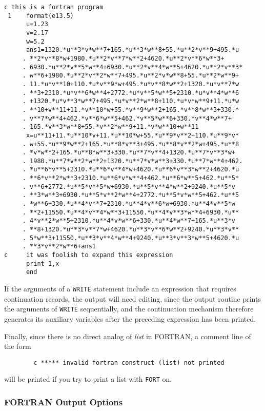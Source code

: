 \documentclass[11pt,letterpaper]{book}
\begin{document}
{\small
{\small\begin{verbatim}
c this is a fortran program
 1    format(e13.5)
      u=1.23
      v=2.17
      w=5.2
      ans1=1320.*u**3*v*w**7+165.*u**3*w**8+55.*u**2*v**9+495.*u
     . **2*v**8*w+1980.*u**2*v**7*w**2+4620.*u**2*v**6*w**3+
     . 6930.*u**2*v**5*w**4+6930.*u**2*v**4*w**5+4620.*u**2*v**3*
     . w**6+1980.*u**2*v**2*w**7+495.*u**2*v*w**8+55.*u**2*w**9+
     . 11.*u*v**10+110.*u*v**9*w+495.*u*v**8*w**2+1320.*u*v**7*w
     . **3+2310.*u*v**6*w**4+2772.*u*v**5*w**5+2310.*u*v**4*w**6
     . +1320.*u*v**3*w**7+495.*u*v**2*w**8+110.*u*v*w**9+11.*u*w
     . **10+v**11+11.*v**10*w+55.*v**9*w**2+165.*v**8*w**3+330.*
     . v**7*w**4+462.*v**6*w**5+462.*v**5*w**6+330.*v**4*w**7+
     . 165.*v**3*w**8+55.*v**2*w**9+11.*v*w**10+w**11
      x=u**11+11.*u**10*v+11.*u**10*w+55.*u**9*v**2+110.*u**9*v*
     . w+55.*u**9*w**2+165.*u**8*v**3+495.*u**8*v**2*w+495.*u**8
     . *v*w**2+165.*u**8*w**3+330.*u**7*v**4+1320.*u**7*v**3*w+
     . 1980.*u**7*v**2*w**2+1320.*u**7*v*w**3+330.*u**7*w**4+462.
     . *u**6*v**5+2310.*u**6*v**4*w+4620.*u**6*v**3*w**2+4620.*u
     . **6*v**2*w**3+2310.*u**6*v*w**4+462.*u**6*w**5+462.*u**5*
     . v**6+2772.*u**5*v**5*w+6930.*u**5*v**4*w**2+9240.*u**5*v
     . **3*w**3+6930.*u**5*v**2*w**4+2772.*u**5*v*w**5+462.*u**5
     . *w**6+330.*u**4*v**7+2310.*u**4*v**6*w+6930.*u**4*v**5*w
     . **2+11550.*u**4*v**4*w**3+11550.*u**4*v**3*w**4+6930.*u**
     . 4*v**2*w**5+2310.*u**4*v*w**6+330.*u**4*w**7+165.*u**3*v
     . **8+1320.*u**3*v**7*w+4620.*u**3*v**6*w**2+9240.*u**3*v**
     . 5*w**3+11550.*u**3*v**4*w**4+9240.*u**3*v**3*w**5+4620.*u
     . **3*v**2*w**6+ans1
c     it was foolish to expand this expression
      print 1,x
      end
\end{verbatim}}
}
If the arguments of a {\tt WRITE} statement include an expression that
requires continuation records, the output will need editing, since the
output routine prints the arguments of {\tt WRITE} sequentially, and the
continuation mechanism therefore generates its auxiliary variables after
the preceding expression has been printed.

Finally, since there is no direct analog of {\em list\/} in FORTRAN,
a comment line of the form
{\small\begin{verbatim}
        c ***** invalid fortran construct (list) not printed
\end{verbatim}}
will be printed if you try to print a list with {\tt FORT} on.

\subsubsection{{FORTRAN} Output Options}
\end{document}
